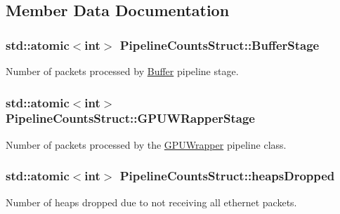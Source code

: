 \subsection{Member Data Documentation}
\subsubsection[{\texorpdfstring{Buffer\+Stage}{BufferStage}}]{\setlength{\rightskip}{0pt plus 5cm}std\+::atomic$<$int$>$ Pipeline\+Counts\+Struct\+::\+Buffer\+Stage}\hypertarget{struct_pipeline_counts_struct_ac9f597d988bf273feee0a10fad2a7a71}{}\label{struct_pipeline_counts_struct_ac9f597d988bf273feee0a10fad2a7a71}
Number of packets processed by \hyperlink{class_buffer}{Buffer} pipeline stage. 
\subsubsection[{\texorpdfstring{G\+P\+U\+W\+Rapper\+Stage}{GPUWRapperStage}}]{\setlength{\rightskip}{0pt plus 5cm}std\+::atomic$<$int$>$ Pipeline\+Counts\+Struct\+::\+G\+P\+U\+W\+Rapper\+Stage}\hypertarget{struct_pipeline_counts_struct_a613300f0885bdeee4d0724651c7aaaf0}{}\label{struct_pipeline_counts_struct_a613300f0885bdeee4d0724651c7aaaf0}
Number of packets processed by the \hyperlink{class_g_p_u_wrapper}{G\+P\+U\+Wrapper} pipeline class. 
\subsubsection[{\texorpdfstring{heaps\+Dropped}{heapsDropped}}]{\setlength{\rightskip}{0pt plus 5cm}std\+::atomic$<$int$>$ Pipeline\+Counts\+Struct\+::heaps\+Dropped}\hypertarget{struct_pipeline_counts_struct_a444def89d06e08f615dacefbde2ec792}{}\label{struct_pipeline_counts_struct_a444def89d06e08f615dacefbde2ec792}
Number of heaps dropped due to not receiving all ethernet packets. 
